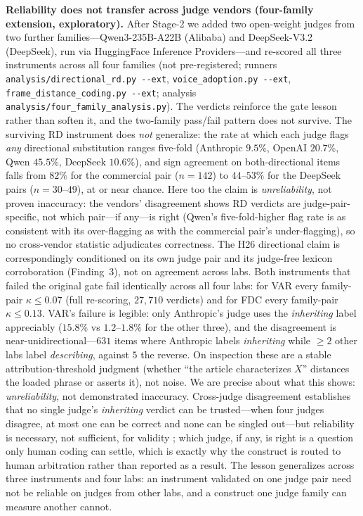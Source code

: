 \documentclass{article}
\newcommand{\kap}{\kappa}
\begin{document}
\textbf{Reliability does not transfer across judge vendors (four-family
extension, exploratory).} After Stage-2 we added two open-weight judges
from two further families---Qwen3-235B-A22B (Alibaba) and
DeepSeek-V3.2 (DeepSeek), run via HuggingFace Inference Providers---and
re-scored all three instruments across all four families (not
pre-registered; runners \texttt{analysis/directional\_rd.py~-{}-ext},
\texttt{voice\_adoption.py~-{}-ext},
\texttt{frame\_distance\_coding.py~-{}-ext}; analysis
\texttt{analysis/four\_family\_analysis.py}). The
verdicts reinforce the gate lesson rather than soften it, and the
two-family pass/fail pattern does not survive. The surviving
RD instrument does \emph{not} generalize: the rate at which each judge
flags \emph{any} directional substitution ranges five-fold (Anthropic
$9.5\%$, OpenAI $20.7\%$, Qwen $45.5\%$, DeepSeek $10.6\%$), and sign
agreement on both-directional items falls from $82\%$ for the
commercial pair ($n{=}142$) to $44$--$53\%$ for the DeepSeek pairs
($n{=}30$--$49$), at or near chance. Here too the claim is
\emph{unreliability}, not proven inaccuracy: the vendors' disagreement
shows RD verdicts are judge-pair-specific, not which pair---if any---is
right (Qwen's five-fold-higher flag rate is as consistent with its
over-flagging as with the commercial pair's under-flagging), so no
cross-vendor statistic adjudicates correctness. The H26 directional
claim is correspondingly conditioned on its own judge pair and its
judge-free lexicon corroboration (Finding~3), not on agreement across
labs. Both instruments that failed the
original gate fail identically across all four labs: for VAR every
family-pair $\kap \le 0.07$ (full re-scoring, $27{,}710$ verdicts) and
for FDC every family-pair $\kap \le 0.13$. VAR's failure is legible:
only Anthropic's judge uses the \emph{inheriting} label appreciably
($15.8\%$ vs $1.2$--$1.8\%$ for the other three), and the disagreement
is near-unidirectional---$631$ items where Anthropic labels
\emph{inheriting} while $\ge2$ other labs label \emph{describing},
against $5$ the reverse. On inspection these are a stable
attribution-threshold judgment (whether ``the article characterizes
$X$'' distances the loaded phrase or asserts it), not noise. We are
precise about what this shows: \emph{unreliability}, not demonstrated
inaccuracy. Cross-judge disagreement establishes that no single judge's
\emph{inheriting} verdict can be trusted---when four judges disagree, at
most one can be correct and none can be singled out---but reliability is
necessary, not sufficient, for validity \citep{jacobs2021measurement};
which judge, if any, is right is a question only human coding can
settle, which is exactly why the construct is routed to human
arbitration rather than reported as a result. The lesson
generalizes across three instruments and four labs: an instrument
validated on one judge pair need not be reliable on judges from other
labs, and a construct one judge family can measure another cannot.
\end{document}
